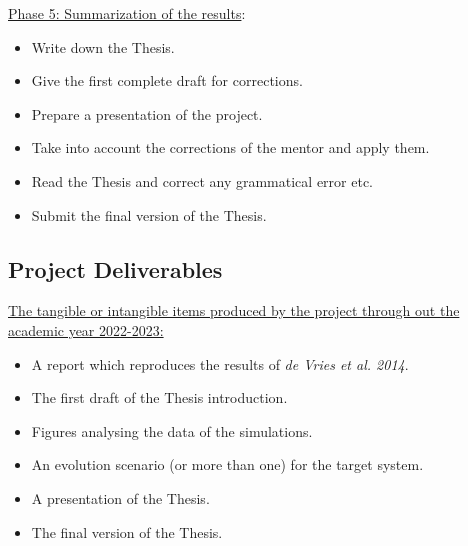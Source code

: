 \documentclass{uva-inf-article}
\numberwithin{equation}{section}
\begin{document}
\hspace*{-0.7cm}\underline{Phase 5: Summarization of the results}:
\begin{itemize}
    \item Write down the Thesis.
    \item Give the first complete draft for corrections.
    \item Prepare a presentation of the project.
    \item Take into account the corrections of the mentor and apply them.
    \item Read the Thesis and correct any grammatical error etc.
    \item Submit the final version of the Thesis.
\end{itemize}

\subsection{Project Deliverables}
\underline{The tangible or intangible items produced by the project through out the academic year 2022-2023:}\\
\vspace{0.1cm}
\begin{itemize}
    \item A report which reproduces the results of {\it de Vries et al. 2014}.
    \item The first draft of the Thesis introduction.
    \item Figures analysing the data of the simulations.
    \item An evolution scenario (or more than one) for the target system.
    \item A presentation of the Thesis.
    \item The final version of the Thesis.
\end{itemize}




\end{document}
